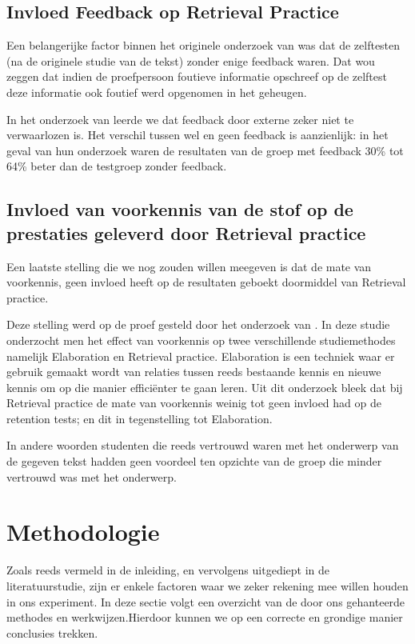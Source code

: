 \documentclass{hogent-article}
\begin{document}
\subsection{Invloed Feedback op Retrieval Practice}

Een belangerijke factor binnen het originele onderzoek van \textcite{Roediger_2006} was dat de zelftesten (na de originele studie van de tekst) zonder enige feedback waren. Dat wou zeggen dat indien de proefpersoon foutieve informatie opschreef op de zelftest deze informatie ook foutief werd opgenomen in het geheugen.\\
\par
\noindent
In het onderzoek van \textcite{Roediger_2011} leerde we dat feedback door externe zeker niet te verwaarlozen is. Het verschil tussen wel en geen feedback is aanzienlijk: in het geval van hun onderzoek waren de resultaten van de groep met feedback 30\% tot 64\% beter dan de testgroep zonder feedback.

\subsection{Invloed van voorkennis van de stof op de prestaties geleverd door Retrieval practice}
\label{voorkennis}
Een laatste stelling die we nog zouden willen meegeven is dat de mate van voorkennis, geen invloed heeft op de resultaten geboekt doormiddel van Retrieval practice.\\
\par
\noindent
Deze stelling werd op de proef gesteld door het onderzoek van \textcite{Xiaofeng_2016}. In deze studie onderzocht men het effect van voorkennis op twee verschillende studiemethodes namelijk Elaboration en Retrieval practice. Elaboration is een techniek waar er gebruik gemaakt wordt van relaties tussen reeds bestaande kennis en nieuwe kennis om op die manier efficiënter te gaan leren. Uit dit onderzoek bleek dat bij Retrieval practice de mate van voorkennis weinig tot geen invloed had op de retention tests; en dit in tegenstelling tot Elaboration.\\
\par
\noindent
In andere woorden studenten die reeds vertrouwd waren met het onderwerp van de gegeven tekst hadden geen voordeel ten opzichte van de groep die minder vertrouwd was met het onderwerp.

\section{Methodologie}
\label{methodologie}
Zoals reeds vermeld in de inleiding, en vervolgens uitgediept in de literatuurstudie, zijn er enkele factoren waar we zeker rekening mee willen houden in ons experiment. In deze sectie volgt een overzicht van de door ons gehanteerde methodes en werkwijzen.Hierdoor kunnen we op een correcte en grondige manier conclusies trekken.
\end{document}
